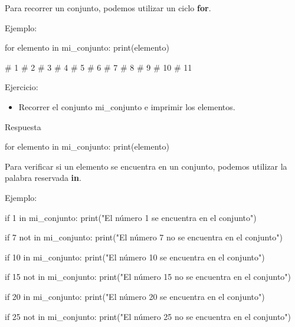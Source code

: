 \documentclass[
  a4paper,
  DIV=11,
  numbers=noendperiod,
  onepage,
  openany]{scrreprt}
\newenvironment{Shaded}{\begin{snugshade}}{\end{snugshade}}
\newcommand{\BuiltInTok}[1]{\textcolor[rgb]{0.00,0.23,0.31}{#1}}
\newcommand{\CommentTok}[1]{\textcolor[rgb]{0.37,0.37,0.37}{#1}}
\newcommand{\ControlFlowTok}[1]{\textcolor[rgb]{0.00,0.23,0.31}{#1}}
\newcommand{\DecValTok}[1]{\textcolor[rgb]{0.68,0.00,0.00}{#1}}
\newcommand{\KeywordTok}[1]{\textcolor[rgb]{0.00,0.23,0.31}{#1}}
\newcommand{\NormalTok}[1]{\textcolor[rgb]{0.00,0.23,0.31}{#1}}
\newcommand{\StringTok}[1]{\textcolor[rgb]{0.13,0.47,0.30}{#1}}
\providecommand{\tightlist}{%
  \setlength{\itemsep}{0pt}\setlength{\parskip}{0pt}}\usepackage{longtable,booktabs,array}
\begin{document}
Para recorrer un conjunto, podemos utilizar un ciclo \textbf{for}.

Ejemplo:

\begin{Shaded}
\begin{Highlighting}[]
\ControlFlowTok{for}\NormalTok{ elemento }\KeywordTok{in}\NormalTok{ mi\_conjunto:}
    \BuiltInTok{print}\NormalTok{(elemento)}

\CommentTok{\# 1}
\CommentTok{\# 2}
\CommentTok{\# 3}
\CommentTok{\# 4}
\CommentTok{\# 5}
\CommentTok{\# 6}
\CommentTok{\# 7}
\CommentTok{\# 8}
\CommentTok{\# 9}
\CommentTok{\# 10}
\CommentTok{\# 11}
\end{Highlighting}
\end{Shaded}

Ejercicio:

\begin{itemize}
\tightlist
\item
  Recorrer el conjunto mi\_conjunto e imprimir los elementos.
\end{itemize}

Respuesta

\begin{Shaded}
\begin{Highlighting}[]
\ControlFlowTok{for}\NormalTok{ elemento }\KeywordTok{in}\NormalTok{ mi\_conjunto:}
    \BuiltInTok{print}\NormalTok{(elemento)}
\end{Highlighting}
\end{Shaded}

Para verificar si un elemento se encuentra en un conjunto, podemos
utilizar la palabra reservada \textbf{in}.

Ejemplo:

\begin{Shaded}
\begin{Highlighting}[]
\ControlFlowTok{if} \DecValTok{1} \KeywordTok{in}\NormalTok{ mi\_conjunto:}
    \BuiltInTok{print}\NormalTok{(}\StringTok{"El número 1 se encuentra en el conjunto"}\NormalTok{)}

\ControlFlowTok{if} \DecValTok{7} \KeywordTok{not} \KeywordTok{in}\NormalTok{ mi\_conjunto:}
    \BuiltInTok{print}\NormalTok{(}\StringTok{"El número 7 no se encuentra en el conjunto"}\NormalTok{)}

\ControlFlowTok{if} \DecValTok{10} \KeywordTok{in}\NormalTok{ mi\_conjunto:}
    \BuiltInTok{print}\NormalTok{(}\StringTok{"El número 10 se encuentra en el conjunto"}\NormalTok{)}

\ControlFlowTok{if} \DecValTok{15} \KeywordTok{not} \KeywordTok{in}\NormalTok{ mi\_conjunto:}
    \BuiltInTok{print}\NormalTok{(}\StringTok{"El número 15 no se encuentra en el conjunto"}\NormalTok{)}

\ControlFlowTok{if} \DecValTok{20} \KeywordTok{in}\NormalTok{ mi\_conjunto:}
    \BuiltInTok{print}\NormalTok{(}\StringTok{"El número 20 se encuentra en el conjunto"}\NormalTok{)}

\ControlFlowTok{if} \DecValTok{25} \KeywordTok{not} \KeywordTok{in}\NormalTok{ mi\_conjunto:}
    \BuiltInTok{print}\NormalTok{(}\StringTok{"El número 25 no se encuentra en el conjunto"}\NormalTok{)}
\end{Highlighting}
\end{Shaded}
\end{document}
